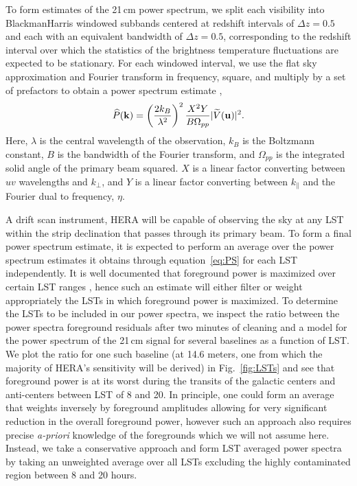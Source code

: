 \documentclass[twocolumn]{emulateapj}
\begin{document}
To form estimates of the 21\,cm power spectrum, we split each visibility into BlackmanHarris windowed subbands centered at redshift intervals of $\Delta z = 0.5$ and each with an equivalent bandwidth of $\Delta z = 0.5$, corresponding to the redshift interval over which the statistics of the brightness temperature fluctuations are expected to be stationary. For each windowed interval, we use the flat sky approximation and  Fourier transform in frequency, square, and multiply by a set of prefactors to obtain a power spectrum estimate \citep{Parsons:2014},
\begin{equation}\label{eq:PS}
\widehat{P}({\bf k}) = \left( \frac{2 k_B}{\lambda^2} \right)^2 \frac{X^2 Y}{B \Omega_{pp}} | \widetilde{V}({\bf u}) |^2.
\end{equation}
Here, $\lambda$ is the central wavelength of the observation, $k_B$ is the Boltzmann constant, $B$ is the bandwidth of the Fourier transform, and $\Omega_{pp}$ is the integrated solid angle of the primary beam squared. $X$ is a linear factor converting between $uv$ wavelengths and $k_\perp$, and $Y$ is a linear factor converting between $k_\parallel$ and the Fourier dual to frequency, $\eta$. 

A drift scan instrument, HERA will be capable of observing the sky at any LST within the strip declination that passes through its primary beam. To form a final power spectrum estimate, it is expected to perform an average over the power spectrum estimates it obtains through equation~\ref{eq:PS} for each LST independently. It is well documented that foreground power is maximized over certain LST ranges \citep{Thyagarajan:2015a}, hence such an estimate will either filter or weight appropriately the LSTs in which foreground power is maximized. To determine the LSTs to be included in our power spectra, we inspect the ratio between the power spectra foreground residuals after two minutes of cleaning and a model for the power spectrum of the 21\,cm signal for several baselines as a function of LST. We plot the ratio for one such baseline (at 14.6 meters, one from which the majority of HERA's sensitivity will be derived) in Fig.~\ref{fig:LSTs} and see that foreground power is at its worst during the transits of the galactic centers and anti-centers between LST of 8 and 20. In principle, one could form an average that weights inversely by foreground amplitudes allowing for very significant reduction in the overall foreground power, however such an approach also requires precise {\it a-priori} knowledge of the foregrounds which we will not assume here. Instead, we take a conservative approach and form LST averaged power spectra by taking an unweighted average over all LSTs excluding the highly contaminated region between 8 and 20 hours. 
\end{document}
